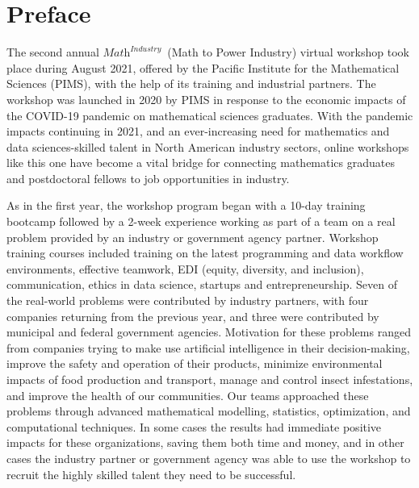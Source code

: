\documentclass[11pt]{report}
\begin{document}
\newcommand{\mtopi}{$\textit{Math}^\textit{Industry}$~}
\newcommand{\person}[2]{\textbf{#1}, #2}
\sectionfont{\centering\sc\MakeLowercase}



\section*{Preface}
The second annual \mtopi (Math to Power Industry) virtual workshop took place
during August 2021, offered by the Pacific Institute for the Mathematical
Sciences (PIMS), with the help of its training and industrial partners.  The
workshop was launched in 2020 by PIMS in response to the economic impacts of
the COVID-19 pandemic on mathematical sciences graduates.  With the pandemic
impacts continuing in 2021, and an ever-increasing need for mathematics and
data sciences-skilled talent in North American industry sectors, online
workshops like this one have become a vital bridge for connecting mathematics
graduates and postdoctoral fellows to job opportunities in industry.

As in the first year, the workshop program began with a 10-day training
bootcamp followed by a 2-week experience working as part of a team on a real
problem provided by an industry or government agency partner.  Workshop
training courses included training on the latest programming and data workflow
environments, effective teamwork, EDI (equity, diversity, and inclusion),
communication, ethics in data science, startups and entrepreneurship.  Seven of
the real-world problems were contributed by industry partners, with four
companies returning from the previous year, and three were contributed by
municipal and federal government agencies.  Motivation for these problems
ranged from companies trying to make use artificial intelligence in their
decision-making, improve the safety and operation of their products, minimize
environmental impacts of food production and transport, manage and control
insect infestations, and improve the health of our communities.  Our teams
approached these problems through advanced mathematical modelling, statistics,
optimization, and computational techniques.  In some cases the results had
immediate positive impacts for these organizations, saving them both time and
money, and in other cases the industry partner or government agency was able to
use the workshop to recruit the highly skilled talent they need to be
successful.  
\end{document}
